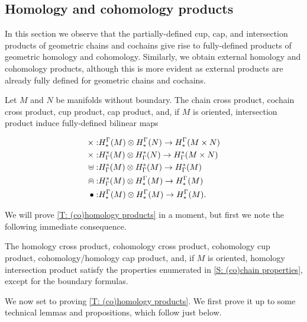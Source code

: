 \subsection{Homology and cohomology products}\label{S: homology products}

In this section we observe that the partially-defined cup, cap, and intersection products of geometric chains and cochains give rise to fully-defined products of geometric homology and cohomology. Similarly, we obtain external homology and cohomology products, although this is more evident as external products are already fully defined for geometric chains and cochains.

\begin{theorem}\label{T: (co)homology products}
Let $M$ and $N$ be manifolds without boundary. The chain cross product, cochain cross product, cup product, cap product, and, if $M$ is oriented, intersection product induce fully-defined bilinear maps

\begin{align*}
\times:& H^\Gamma_*(M)\otimes H^\Gamma_*(N) \to H^\Gamma_*(M \times N)\\
\times:& H_\Gamma^*(M)\otimes H_\Gamma^*(N) \to H_\Gamma^*(M \times N)\\
\uplus:& H_\Gamma^*(M)\otimes H_\Gamma^*(M) \to H_\Gamma^*(M)\\
\nplus:& H_\Gamma^*(M)\otimes H^\Gamma_*(M) \to H^\Gamma_*(M)\\
\bullet:& H^\Gamma_*(M)\otimes H^\Gamma_*(M) \to H^\Gamma_*(M).\\
\end{align*}
\end{theorem}

We will prove \cref{T: (co)homology products} in a moment, but first we note the following immediate consequence.
\begin{theorem}
The homology cross product, cohomology cross product, cohomology cup product, cohomology/homology cap product, and, if $M$ is oriented, homology intersection product satisfy the properties enumerated in \cref{S: (co)chain properties}, except for the boundary formulas.
\end{theorem}



We now set to proving \cref{T: (co)homology products}. We first prove it up to some technical lemmas and propositions, which follow just below.

